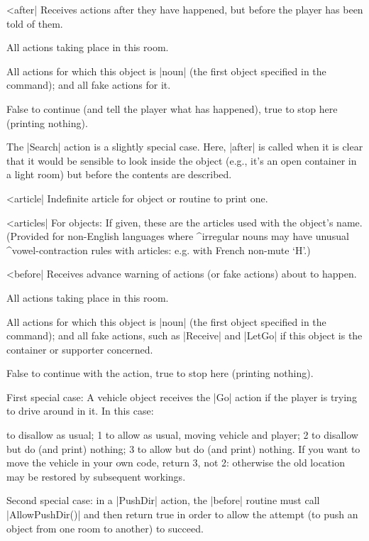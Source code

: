 \nrr

^^|after|
Receives actions after they have happened, but before the player has
been told of them.

\fr All actions taking place in this room.

\fo All actions for which this object is |noun| (the first object
specified in the command); and all fake actions for it.

\rr False to continue (and tell the player what has happened), true to
stop here (printing nothing).

\noindent The |Search| action is a slightly special case.  Here, |after| is
called when it is clear that it would be sensible to look inside the object
(e.g., it's an open container in a light room) but before the contents
are described.

^^|article|
\fo Indefinite article for object or routine to print one.

\nrr

^^|articles|
For objects: If given, these are the articles used with
the object's name.  (Provided for non-English languages
where ^{irregular nouns} may have unusual ^{vowel-contraction}
rules with articles: e.g. with French non-mute `H'.)

^^|before|
Receives advance warning of actions (or fake actions) about to happen.

\fr All actions taking place in this room.

\fo All actions for which this object is |noun| (the first object
specified in the command); and all fake actions, such as |Receive|
and |LetGo| if this object is the container or supporter concerned.

\rr False to continue with the action, true to stop here (printing
nothing).

\noindent First special case: A vehicle object receives the |Go|
action if the player is trying to drive around in it.  In this case:

 to disallow as usual; 1 to allow as usual, moving vehicle and
player; 2 to disallow but do (and print) nothing; 3 to allow but do
(and print) nothing.  If you want to move the vehicle in your own code,
return 3, not 2: otherwise the old location may be restored by subsequent
workings.

\noindent Second special case: in a |PushDir| action, the |before|
routine must call |AllowPushDir()| and then return true in order to
allow the attempt (to push an object from one room to another) to
succeed.


